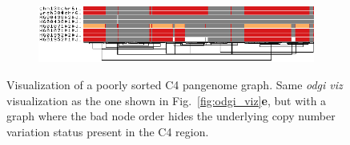\begin{figure}[h!]
	\begin{subfigure}{\linewidth}
		\centering
		\includegraphics[width=1.0\linewidth, trim=-0cm 2cm 0 0cm]{fig/sorting/chr6_pan_fa_a2fb268_4030258_6a1ecc2_smooth_C4_bad_sorted}
		\label{fig:bad-sorting}
	\end{subfigure}
	\caption{
		Visualization of a poorly sorted C4 pangenome graph.
		Same \textit{odgi viz} visualization as the one shown in Fig.~\ref{fig:odgi_viz}\textbf{e}, but with a graph where the bad node order hides the underlying copy number variation status present in the C4 region.
	}
	\label{fig:sorting}
\end{figure}
